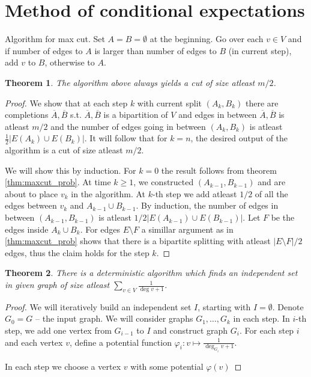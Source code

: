 \documentclass{article}
\theoremstyle{plain}
\newtheorem{thm}{Theorem}[section]
\theoremstyle{definition}
\begin{document}
\section{Method of conditional expectations}


Algorithm for max cut. Set $A=B=\emptyset$ at the beginning. Go over each $v\in V$ and if number of edges to $A$ is larger than number of edges to $B$ (in current step), add $v$ to $B$, otherwise to $A$.

\begin{thm}
	The algorithm above always yields a cut of size atleast $m/2$.
\end{thm}
\begin{proof}
	We show that at each step $k$ with current split $(A_k,B_k)$ there are completions $\overline{A},\overline{B}$ s.t. $\overline{A},\overline{B}$ is a bipartition of $V$ and edges in between $\overline{A},\overline{B}$ is atleast $m/2$ and the number of edges going in between $(A_k,B_k)$ is atleast $\frac{1}{2}|E(A_k)\cup E(B_k)|$. It will follow that for $k=n$, the desired output of the algorithm is a cut of size atleast $m/2$.
	
	We will show this by induction. For $k=0$ the result follows from theorem \ref{thm:maxcut_prob}. At time $k\geq 1$, we constructed $(A_{k-1},B_{k-1})$ and are about to place $v_k$ in the algorithm. At $k$-th step we add atleast $1/2$ of all the edges between $v_k$ and $A_{k-1}\cup B_{k-1}$. By induction, the number of edges in between $(A_{k-1},B_{k-1})$ is atleast $1/2|E(A_{k-1})\cup E(B_{k-1})|$. Let $F$ be the edges inside $A_{k}\cup B_k$. For edges $E\setminus F$ a simillar argument as in \ref{thm:maxcut_prob} shows that there is a bipartite splitting with atleast $|E\setminus F|/2$ edges, thus the claim holds for the step $k$.
\end{proof}

\begin{thm}
	There is a deterministic algorithm which finds an independent set in given graph of size atleast $\sum_{v\in V}\frac{1}{\deg v + 1}$.
\end{thm}
\begin{proof}
	We will iteratively build an independent set $I$, starting with $I=\emptyset$. Denote $G_0=G$ -- the input graph. We will consider graphs $G_1,\ldots,G_k$ in each step. In $i$-th step, we add one vertex from $G_{i-1}$ to $I$ and construct graph $G_i$. For each step $i$ and each vertex $v$, define a potential function $\varphi_i:v\mapsto \frac{1}{\deg_{G_i} v+1}$.
	
	
	
	In each step we choose a vertex $v$ with some potential $\varphi(v)$
\end{proof}
\end{document}
